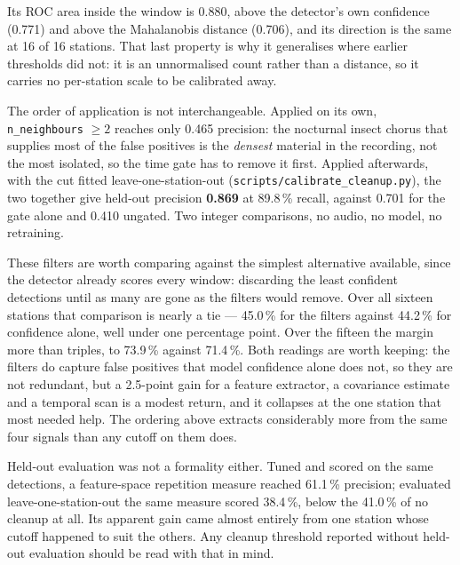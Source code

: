\documentclass[review,3p,times]{elsarticle}
\begin{document}
Its ROC area inside the window is 0.880, above the detector's own confidence
(0.771) and above the Mahalanobis distance (0.706), and its direction is the
same at 16 of 16 stations. That last property is why it generalises where
earlier thresholds did not: it is an unnormalised count rather than a distance,
so it carries no per-station scale to be calibrated away.

The order of application is not interchangeable. Applied on its own,
\texttt{n\_neighbours} $\geq 2$ reaches only 0.465 precision: the nocturnal
insect chorus that supplies most of the false positives is the \emph{densest}
material in the recording, not the most isolated, so the time gate has to remove
it first. Applied afterwards, with the cut fitted leave-one-station-out
(\texttt{scripts/calibrate\_cleanup.py}), the two together give held-out
precision \textbf{0.869} at 89.8\,\% recall, against 0.701 for the gate alone
and 0.410 ungated. Two integer comparisons, no audio, no model, no retraining.

These filters are worth comparing against the simplest alternative available,
since the detector already scores every window: discarding the least confident
detections until as many are gone as the filters would remove. Over all sixteen
stations that comparison is nearly a tie --- 45.0\,\% for the filters against
44.2\,\% for confidence alone, well under one percentage point. Over the fifteen
the margin more than triples, to 73.9\,\% against 71.4\,\%. Both readings are
worth keeping: the filters do capture false positives that model confidence
alone does not, so they are not redundant, but a 2.5-point gain for a feature
extractor, a covariance estimate and a temporal scan is a modest return, and it
collapses at the one station that most needed help. The ordering above extracts
considerably more from the same four signals than any cutoff on them does.

Held-out evaluation was not a formality either. Tuned and scored on the same
detections, a feature-space repetition measure reached 61.1\,\% precision;
evaluated leave-one-station-out the same measure scored 38.4\,\%, below the
41.0\,\% of no cleanup at all. Its apparent gain came almost entirely from one
station whose cutoff happened to suit the others. Any cleanup threshold
reported without held-out evaluation should be read with that in mind.
\end{document}
